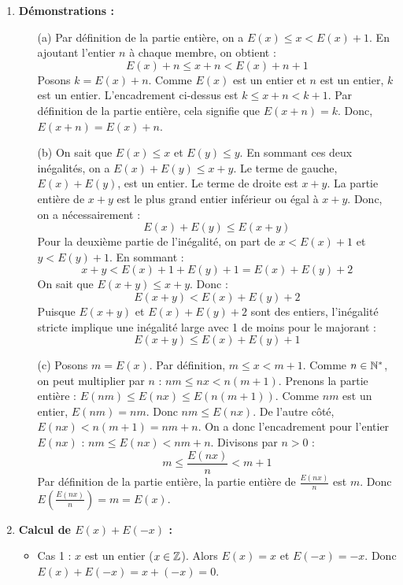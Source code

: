 \documentclass[solutions]{exercices}
\begin{document}
\begin{solution}
\begin{enumerate}
		\item \textbf{Démonstrations :}
		      \begin{enumerate}
			      \item[(a)] Par définition de la partie entière, on a $E(x) \leq x < E(x)+1$. En ajoutant l'entier $n$ à chaque membre, on obtient :
			            \[ E(x)+n \leq x+n < E(x)+n+1 \]
			            Posons $k = E(x)+n$. Comme $E(x)$ est un entier et $n$ est un entier, $k$ est un entier. L'encadrement ci-dessus est $k \leq x+n < k+1$. Par définition de la partie entière, cela signifie que $E(x+n) = k$.
			            Donc, $E(x+n) = E(x)+n$.
			      \item[(b)] On sait que $E(x) \leq x$ et $E(y) \leq y$. En sommant ces deux inégalités, on a $E(x)+E(y) \leq x+y$.
			            Le terme de gauche, $E(x)+E(y)$, est un entier. Le terme de droite est $x+y$. La partie entière de $x+y$ est le plus grand entier inférieur ou égal à $x+y$. Donc, on a nécessairement :
			            \[ E(x)+E(y) \leq E(x+y) \]
			            Pour la deuxième partie de l'inégalité, on part de $x < E(x)+1$ et $y < E(y)+1$. En sommant :
			            \[ x+y < E(x)+1 + E(y)+1 = E(x)+E(y)+2 \]
			            On sait que $E(x+y) \leq x+y$. Donc :
			            \[ E(x+y) < E(x)+E(y)+2 \]
			            Puisque $E(x+y)$ et $E(x)+E(y)+2$ sont des entiers, l'inégalité stricte implique une inégalité large avec 1 de moins pour le majorant :
			            \[ E(x+y) \leq E(x)+E(y)+1 \]
			      \item[(c)] Posons $m = E(x)$. Par définition, $m \leq x < m+1$.
			            Comme $n \in \mathbb{N}^*$, on peut multiplier par $n$ : $nm \leq nx < n(m+1)$.
			            Prenons la partie entière : $E(nm) \leq E(nx) \leq E(n(m+1))$. Comme $nm$ est un entier, $E(nm)=nm$.
			            Donc $nm \leq E(nx)$.
			            De l'autre côté, $E(nx) < n(m+1) = nm+n$.
			            On a donc l'encadrement pour l'entier $E(nx)$ : $nm \leq E(nx) < nm+n$.
			            Divisons par $n > 0$ :
			            \[ m \leq \frac{E(nx)}{n} < m+1 \]
			            Par définition de la partie entière, la partie entière de $\frac{E(nx)}{n}$ est $m$.
			            Donc $E\left(\frac{E(nx)}{n}\right) = m = E(x)$.
		      \end{enumerate}
		\item \textbf{Calcul de $E(x)+E(-x)$ :}
		      \begin{itemize}
			      \item Cas 1 : $x$ est un entier ($x \in \mathbb{Z}$).
			            Alors $E(x)=x$ et $E(-x)=-x$.
			            Donc $E(x)+E(-x) = x + (-x) = 0$.

\end{itemize}
\end{enumerate}
\end{solution}
\end{document}
